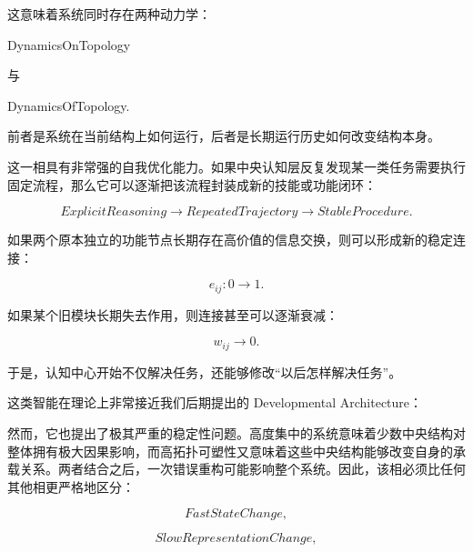 这意味着系统同时存在两种动力学：

\begin{statementbox}
DynamicsOnTopology
\end{statementbox}

与

\begin{statementbox}
DynamicsOfTopology.
\end{statementbox}

前者是系统在当前结构上如何运行，后者是长期运行历史如何改变结构本身。

这一相具有非常强的自我优化能力。如果中央认知层反复发现某一类任务需要执行固定流程，那么它可以逐渐把该流程封装成新的技能或功能闭环：

\begin{equation}
ExplicitReasoning
\rightarrow
RepeatedTrajectory
\rightarrow
StableProcedure.
\end{equation}

如果两个原本独立的功能节点长期存在高价值的信息交换，则可以形成新的稳定连接：

\begin{equation}
e_{ij}:0\rightarrow1.
\end{equation}

如果某个旧模块长期失去作用，则连接甚至可以逐渐衰减：

\begin{equation}
w_{ij}\rightarrow0.
\end{equation}

于是，认知中心开始不仅解决任务，还能够修改“以后怎样解决任务”。

这类智能在理论上非常接近我们后期提出的 Developmental Architecture：

\begin{statementbox}
\centering
{}
\end{statementbox}

然而，它也提出了极其严重的稳定性问题。高度集中的系统意味着少数中央结构对整体拥有极大因果影响，而高拓扑可塑性又意味着这些中央结构能够改变自身的承载关系。两者结合之后，一次错误重构可能影响整个系统。因此，该相必须比任何其他相更严格地区分：

\begin{equation}
FastStateChange,
\end{equation}

\begin{equation}
SlowRepresentationChange,
\end{equation}

